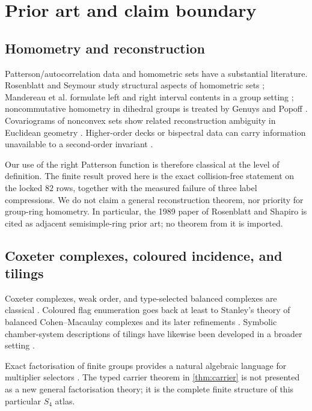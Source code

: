 \section{Prior art and claim boundary}\label{sec:prior-art}

\subsection{Homometry and reconstruction}

Patterson/autocorrelation data and homometric sets have a substantial
literature.  Rosenblatt and Seymour study structural aspects of homometric
sets \cite{RosenblattSeymour1982}; Mandereau et al. formulate left and right
interval contents in a group setting \cite{MandereauEtAl2011}; noncommutative
homometry in dihedral groups is treated by Genuys and Popoff
\cite{GenuysPopoff2018}.  Covariograms of nonconvex sets show related
reconstruction ambiguity in Euclidean geometry \cite{BenassiEtAl2011}.
Higher-order decks or bispectral data can carry information unavailable to a
second-order invariant \cite{RadcliffeScott2007,Kakarala2012}.

Our use of the right Patterson function is therefore classical at the level
of definition.  The finite result proved here is the exact collision-free
statement on the locked $82$ rows, together with the measured failure of
three label compressions.  We do not claim a general reconstruction theorem,
nor priority for group-ring homometry.  In particular, the 1989 paper of
Rosenblatt and Shapiro \cite{RosenblattShapiro1989} is cited as adjacent
semisimple-ring prior art; no theorem from it is imported.

\subsection{Coxeter complexes, coloured incidence, and tilings}

Coxeter complexes, weak order, and type-selected balanced complexes are
classical \cite{Bjorner1984a,Bjorner1984b}.  Coloured flag enumeration goes
back at least to Stanley's theory of balanced Cohen--Macaulay complexes and
its later refinements \cite{Stanley1979,Frohmader2012,White2022}.  Symbolic
chamber-system descriptions of tilings have likewise been developed in a
broader setting \cite{DressFriedrichsHuson1995,DressHuson1987}.

Exact factorisation of finite groups provides a natural algebraic language
for multiplier selectors \cite{BildanovEtAl2020}.  The typed carrier theorem
in \cref{thm:carrier} is not presented as a new general factorisation theory;
it is the complete finite structure of this particular $S_4$ atlas.


